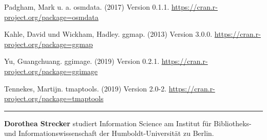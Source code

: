 \documentclass[a4paper,
fontsize=11pt,
oneside,
numbers=noperiodatend,
parskip=half-,
bibliography=totoc,
final
]{scrartcl}
\begin{document}
Padgham, Mark u. a. osmdata. (2017) Version 0.1.1.
\url{https://cran.r-project.org/package=osmdata}

Kahle, David und Wickham, Hadley. ggmap. (2013) Version 3.0.0.
\url{https://cran.r-project.org/package=ggmap}

Yu, Guangchuang. ggimage. (2019) Version 0.2.1.
\url{https://cran.r-project.org/package=ggimage}

Tennekes, Martijn. tmaptools. (2019) Version 2.0-2.
\url{https://cran.r-project.org/package=tmaptools}

\begin{center}\rule{0.5\linewidth}{0.5pt}\end{center}

\textbf{Dorothea Strecker} studiert Information Science am Institut für
Bibliotheks- und Informationswissenschaft der Humboldt-Universität zu
Berlin.
\end{document}
